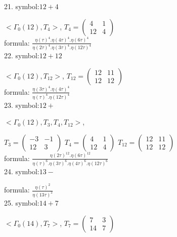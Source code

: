 21. symbol:$ 12+4 $

$ < \Gamma_0 ( 12 ), T_{4} >  $,
$
T_{4} = 
\left(
\begin{array}{cc}
4 & 1 \\
12 & 4
\end{array}
\right)
$
\\

formula: 
$ \frac{\eta(\tau)^4 . \eta(4\tau)^4. \eta(6\tau)^4}{\eta(2\tau)^4 . \eta(3\tau)^4. \eta(12\tau)^4} $
\\

22. symbol:$ 12+12 $

$ < \Gamma_0 ( 12 ), T_{12} >  $,
$
T_{12} = 
\left(
\begin{array}{cc}
12 & 11 \\
12 & 12
\end{array}
\right)
$
\\

formula: 
$ \frac{\eta(3\tau)^4 . \eta(4\tau)^4}{\eta(\tau)^4 . \eta(12\tau)^4} $
\\

23. symbol:$ 12+ $

$ < \Gamma_0 ( 12 ), T_{3}, T_{4}, T_{12} >  $,

$
T_{3} = 
\left(
\begin{array}{cc}
-3 & -1 \\
12 & 3
\end{array}
\right)
$
$
T_{4} = 
\left(
\begin{array}{cc}
4 & 1 \\
12 & 4
\end{array}
\right)
$
$
T_{12} = 
\left(
\begin{array}{cc}
12 & 11 \\
12 & 12
\end{array}
\right)
$
\\

formula: 
$ \frac{\eta(2\tau)^{12} . \eta(6\tau)^{12}}{\eta(\tau)^6 . \eta(3\tau)^6. \eta(4\tau)^6. \eta(12\tau)^6} $
\\

24. symbol:$ 13- $

formula: 
$ \frac{\eta(\tau)^2 }{\eta(13\tau)^2 } $
\\

25. symbol:$ 14+7 $

$ < \Gamma_0 ( 14 ), T_{7} >  $,
$
T_{7} = 
\left(
\begin{array}{cc}
7 & 3 \\
14 & 7
\end{array}
\right)
$
\\

